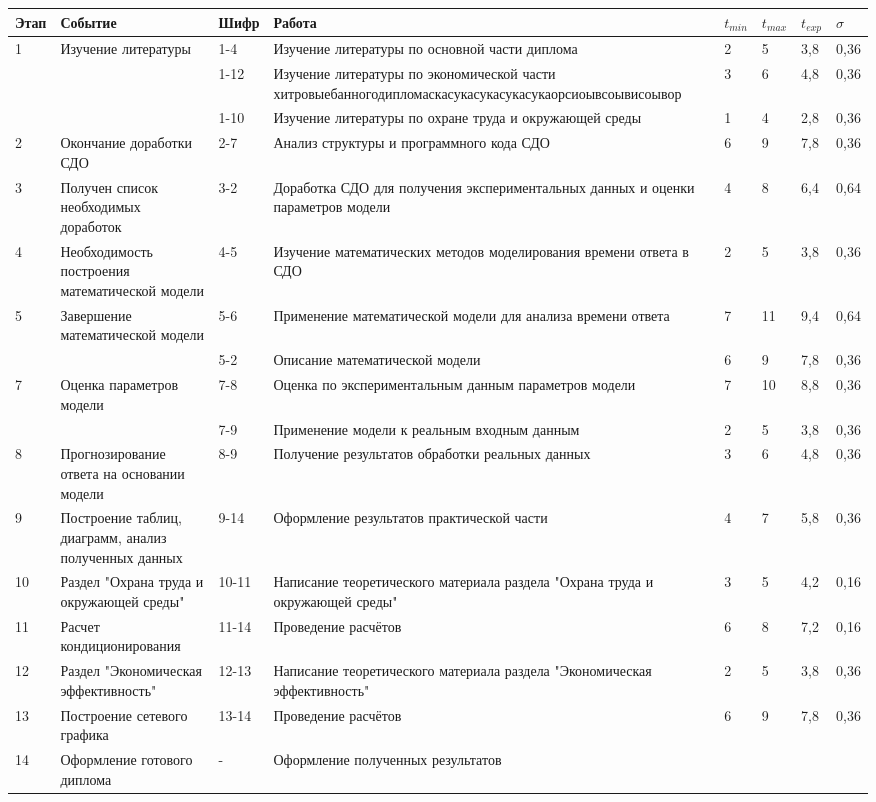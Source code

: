 \documentclass[a4paper,14pt]{extreport} %
\newenvironment{myTable}%
{%
    \tiny
    \begin{longtable}[H]{|p{0.9cm}|p{3.4cm}|p{1.2cm}|p{3.9cm}|p{0.6cm}|p{0.7cm}|p{0.6cm}|p{0.7cm}|}
    \hline
}%
{%
    \end{longtable}
}%
\begin{document}
\begin{myTable}
\hline
Этап & Событие             & Шифр & Работа                                        & $t_{min}$ & $t_{max}$ & $t_{exp}$ & $\sigma$\\
\hline
1    & Изучение литературы & 1-4  & Изучение литературы по основной части диплома & 2         & 5         &  3,8      &  0,36    \\
\cline{3-8}
&

&
1-12&
Изучение литературы по экономической части хитровыебанногодипломаска\-сукасукасукасукаорсиоывсоывисоывор&
3&
6&
4,8&
0,36
\\
\cline{3-8}
&

&
1-10&
Изучение литературы по охране труда и окружающей среды&
1&
4&
2,8&
0,36
\\
\hline
2&
Окончание доработки СДО&
2-7&
Анализ структуры и программного кода СДО&
6&
9&
7,8&
0,36
\\
\hline
3&
Получен список необходимых доработок&
3-2&
Доработка СДО для получения экспериментальных данных и оценки параметров модели&
4&
8&
6,4&
0,64
\\
\hline
4&
Необходимость построения математической модели&
4-5&
Изучение математических методов моделирования времени ответа в СДО&
2&
5&
3,8&
0,36
\\
\hline
5&
Завершение математической модели&
5-6&
Применение математической модели для анализа времени ответа&
7&
11&
9,4&
0,64
\\
\cline{3-8}
&

&
5-2&
Описание математической модели&
6&
9&
7,8&
0,36
\\
\hline
7&
Оценка параметров модели&
7-8&
Оценка по экспериментальным данным параметров модели &
7&
10&
8,8&
0,36
\\
\cline{3-8}
&

&
7-9&
Применение модели к реальным входным данным&
2&
5&
3,8&
0,36
\\
\hline
8&
Прогнозирование ответа на основании модели&
8-9&
Получение результатов обработки реальных данных&
3&
6&
4,8&
0,36
\\
\hline
9&
Построение таблиц, диаграмм, анализ полученных данных&
9-14&
Оформление результатов практической части&
4&
7&
5,8&
0,36
\\
\hline
10&
Раздел "Охрана труда и окружающей среды"&
10-11&
Написание теоретического материала раздела "Охрана труда и окружающей среды"&
3&
5&
4,2&
0,16
\\
\hline
11&
Расчет кондиционирования&
11-14&
Проведение расчётов&
6&
8&
7,2&
0,16
\\
\hline
12&
Раздел "Экономическая эффективность"&
12-13&
Написание теоретического материала раздела "Экономическая эффективность"&
2&
5&
3,8&
0,36
\\
\hline
13&
Построение сетевого графика&
13-14&
Проведение расчётов&
6&
9&
7,8&
0,36
\\
\hline
14&
Оформление готового диплома&
-
&
Оформление полученных результатов&
&

&

&
\\
\hline
\end{myTable}
\end{document}
